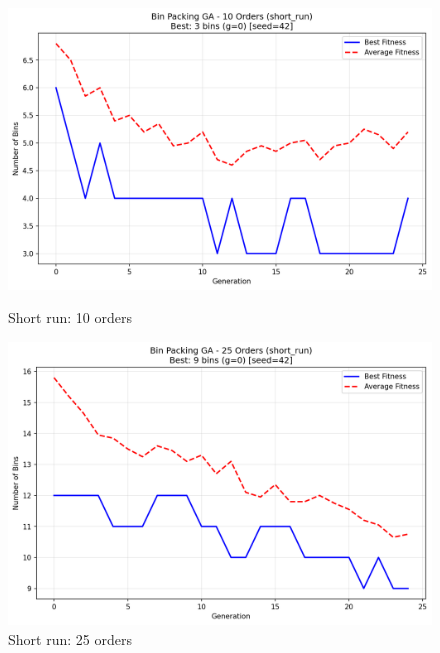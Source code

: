 \documentclass[journal,12pt,onecolumn]{IEEEtran}
\begin{document}
\begin{figure}[htbp]
\begin{minipage}{0.48\textwidth}
    \centering
    \includegraphics[width=\textwidth]{bpp_10items_short_run_seed42.png}
    \caption{Short run: 10 orders}
    \label{fig:short_run_10}
\end{minipage}\hfill
\begin{minipage}{0.48\textwidth}
    \centering
    \includegraphics[width=\textwidth]{bpp_25items_short_run_seed42.png}
    \caption{Short run: 25 orders}
    \label{fig:short_run_25}
\end{minipage}
\end{figure}
\end{document}
